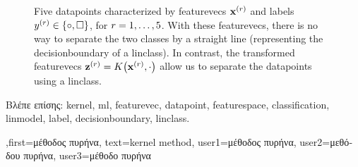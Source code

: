 {{\begin{figure}[H]
\begin{center}
		\end{center}
		\caption{Five \gls{datapoint}s characterized by \gls{featurevec}s ${\bf x}^{(r)}$ 
		and \gls{label}s $y^{(r)} \in \{ \circ, \square \}$, for $r=1,\ldots,5$. 
		With these \gls{featurevec}s, there is no way to separate the two classes 
		by a straight line (representing the \gls{decisionboundary} of a \gls{linclass}). 
		In contrast, the transformed \gls{featurevec}s ${\bf z}^{(r)} = K\big({\bf x}^{(r)},\cdot\big)$ 
		allow us to separate the \gls{datapoint}s using a \gls{linclass}.  \label{fig_linsep_kernel_dict}}
		\end{figure}
\foreignlanguage{greek}{Βλέπε επίσης:} \gls{kernel}, \gls{ml}, \gls{featurevec}, \gls{datapoint}, \gls{featurespace}, \gls{classification}, \gls{linmodel}, \gls{label}, \gls{decisionboundary}, \gls{linclass}.
},first={\foreignlanguage{greek}{μέθοδος πυρήνα}},
text={kernel method},
user1={\foreignlanguage{greek}{μέθοδος πυρήνα}}, %
user2={\foreignlanguage{greek}{μεθόδου πυρήνα}}, %
user3={\foreignlanguage{greek}{μέθοδο πυρήνα}} %
}

